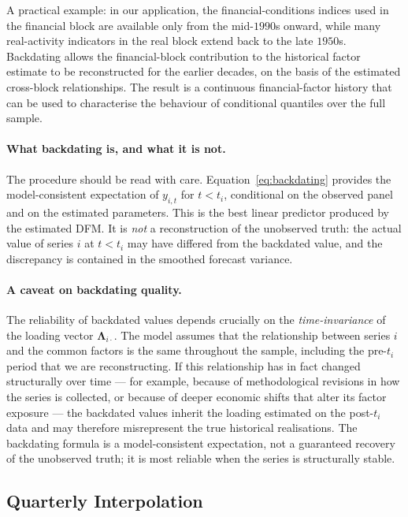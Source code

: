 \documentclass[11pt, a4paper, oneside]{article}
\begin{document}
A practical example: in our application, the financial-conditions
indices used in the financial block are available only from the
mid-$1990$s onward, while many real-activity indicators in the real
block extend back to the late $1950$s. Backdating allows the
financial-block contribution to the historical factor estimate to
be reconstructed for the earlier decades, on the basis of the
estimated cross-block relationships. The result is a continuous
financial-factor history that can be used to characterise the
behaviour of conditional quantiles over the full sample.

\paragraph{What backdating is, and what it is not.}
The procedure should be read with care. Equation~\eqref{eq:backdating}
provides the model-consistent expectation of $y_{i,t}$ for
$t < t_i$, conditional on the observed panel and on the estimated
parameters. This is the best linear predictor produced by the
estimated DFM. It is \emph{not} a reconstruction of the
unobserved truth: the actual value of series $i$ at $t < t_i$ may
have differed from the backdated value, and the discrepancy is
contained in the smoothed forecast variance.

\paragraph{A caveat on backdating quality.}
The reliability of backdated values depends crucially on the
\emph{time-invariance} of the loading vector $\boldsymbol{\Lambda}_{i \cdot}$.
The model assumes that the relationship between series $i$ and the
common factors is the same throughout the sample, including the
pre-$t_i$ period that we are reconstructing. If this relationship has
in fact changed structurally over time — for example, because of
methodological revisions in how the series is collected, or because of
deeper economic shifts that alter its factor exposure — the backdated
values inherit the loading estimated on the post-$t_i$ data and may
therefore misrepresent the true historical realisations. The
backdating formula is a model-consistent expectation, not a
guaranteed recovery of the unobserved truth; it is most reliable
when the series is structurally stable.

\subsection{Quarterly Interpolation}
\end{document}
